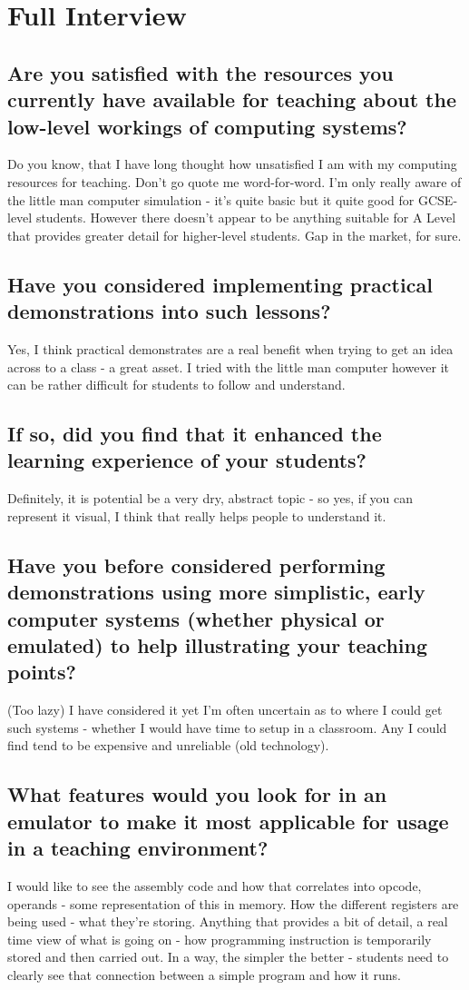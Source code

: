 \section{Full Interview} \label{sec:full-interview}
    \subsection{Are you satisfied with the resources you currently have available for teaching about the low-level workings of computing systems?}
        Do you know, that I have long thought how unsatisfied I am with my computing resources for teaching. Don't go quote me word-for-word. I'm only really aware of the little man computer simulation - it's quite basic but it quite good for GCSE-level students. However there doesn't appear to be anything suitable for A Level that provides greater detail for higher-level students. Gap in the market, for sure.
    
    \subsection{Have you considered implementing practical demonstrations into such lessons?}
        Yes, I think practical demonstrates are a real benefit when trying to get an idea across to a class - a great asset. I tried with the little man computer however it can be rather difficult for students to follow and understand.

    \subsection{If so, did you find that it enhanced the learning experience of your students?}
        Definitely, it is potential be a very dry, abstract topic - so yes, if you can represent it visual, I think that really helps people to understand it.
    
    \subsection{Have you before considered performing demonstrations using more simplistic, early computer systems (whether physical or emulated) to help illustrating your teaching points?}
        (Too lazy) I have considered it yet I'm often uncertain as to where I could get such systems - whether I would have time to setup in a classroom. Any I could find tend to be expensive and unreliable (old technology).
    
    \subsection{What features would you look for in an emulator to make it most applicable for usage in a teaching environment?}
        I would like to see the assembly code and how that correlates into opcode, operands - some representation of this in memory. How the different registers are being used - what they're storing. Anything that provides a bit of detail, a real time view of what is going on - how programming instruction is temporarily stored and then carried out. In a way, the simpler the better - students need to clearly see that connection between a simple program and how it runs.
    
